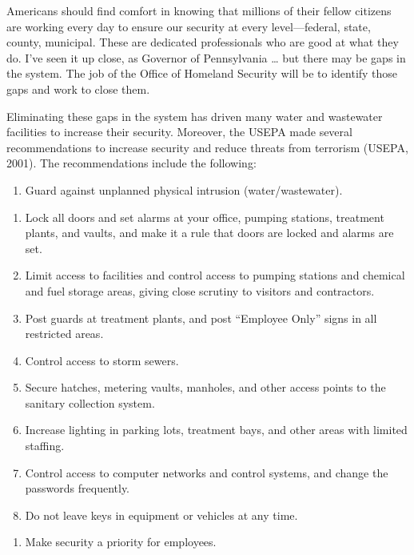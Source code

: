 \documentclass{article}
\begin{document}
Americans should find comfort in knowing that millions of their fellow
citizens are working every day to ensure our security at every
level---federal, state, county, municipal. These are dedicated
professionals who are good at what they do. I've seen it up close, as
Governor of Pennsylvania \ldots{} but there may be gaps in the system.
The job of the Office of Homeland Security will be to identify those
gaps and work to close them.

Eliminating these gaps in the system has driven many water and
wastewater facilities to increase their security. Moreover, the USEPA
made several recommendations to increase security and reduce threats
from terrorism (USEPA, 2001). The recommendations include the following:

\begin{enumerate}
\item
  Guard against unplanned physical intrusion (water/wastewater).
\end{enumerate}

\begin{enumerate}
\item
  Lock all doors and set alarms at your office, pumping stations,
  treatment plants, and vaults, and make it a rule that doors are locked
  and alarms are set.
\item
  Limit access to facilities and control access to pumping stations and
  chemical and fuel storage areas, giving close scrutiny to visitors and
  contractors.
\item
  Post guards at treatment plants, and post ``Employee Only'' signs in
  all restricted areas.
\item
  Control access to storm sewers.
\item
  Secure hatches, metering vaults, manholes, and other access points to
  the sanitary collection system.
\item
  Increase lighting in parking lots, treatment bays, and other areas
  with limited staffing.
\item
  Control access to computer networks and control systems, and change
  the passwords frequently.
\item
  Do not leave keys in equipment or vehicles at any time.
\end{enumerate}

\begin{enumerate}
\item
  Make security a priority for employees.
\end{enumerate}
\end{document}
